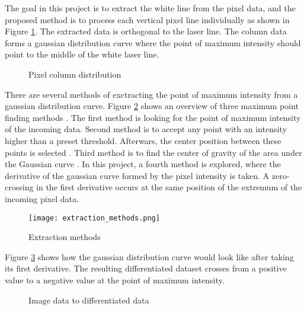 The goal in this project is to extract the white line from the pixel data, and the proposed method is to process each vertical pixel line individually as shown in Figure \ref{fig:sphere_laser_line_pixel_column}. The extracted data is orthogonal to the laser line. The column data forms a gaussian distribution curve where the point of maximum intensity should point to the middle of the white laser line.


\begin{figure}[h]
    \centering
    
    \caption{Pixel column distribution}
    \label{fig:sphere_laser_line_pixel_column}
\end{figure}

There are several methods of exctracting the point of maximum intensity from a gaussian distribution curve. Figure \ref{fig:extraction_methods}  shows an overview of three maximum point finding methods \cite{method_presentation}. The first method is looking for the point of maximum intensity of the incoming data. Second method is to accept any point with an intensity higher than a preset threshold. Afterwars, the center position between these points is selected \cite{7794138}. Third method is to find the center of gravity of the area under the Gaussian curve \cite{7794138}. In this project, a fourth method is explored, where the derivative of the gaussian curve formed by the pixel intensity is taken. A zero-crossing in the first derivative occurs at the same position of the extremum of the incoming pixel data.


\begin{figure}[h]
    \centering
    \texttt{[image: extraction\_methods.png]}
    \caption{Extraction methods \cite{method_presentation}}
    \label{fig:extraction_methods}
\end{figure}

Figure \ref{fig:diff_flow} shows how the gaussian distribution curve would look like after taking its first derivative. The resulting differentiated dataset crosses from a positive value to a negative value at the point of maximum intensity. %


\begin{figure}[h]
    \centering
    
    \caption{Image data to differentiated data}
    \label{fig:diff_flow}
\end{figure}


